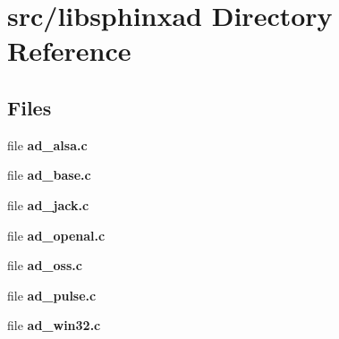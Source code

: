\section{src/libsphinxad Directory Reference}
\label{dir_6b434913578e1a30215dcd3a2a20216a}
\subsection*{Files}
\begin{DoxyCompactItemize}
\item 
file {\bfseries ad\-\_\-alsa.\-c}
\item 
file {\bfseries ad\-\_\-base.\-c}
\item 
file {\bfseries ad\-\_\-jack.\-c}
\item 
file {\bfseries ad\-\_\-openal.\-c}
\item 
file {\bfseries ad\-\_\-oss.\-c}
\item 
file {\bfseries ad\-\_\-pulse.\-c}
\item 
file {\bfseries ad\-\_\-win32.\-c}
\end{DoxyCompactItemize}
